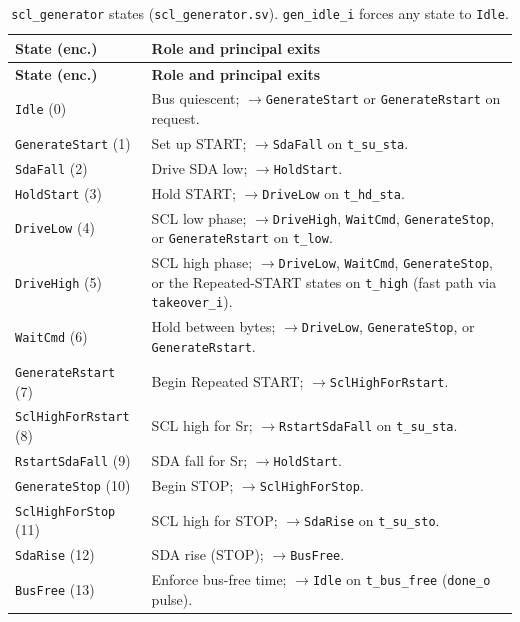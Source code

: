 \begin{longtable}{@{}l>{\raggedright\arraybackslash}p{}@{}}
\caption{\texttt{scl\_generator} states (\texttt{scl\_generator.sv}). \texttt{gen\_idle\_i} forces any state to \texttt{Idle}.}
\label{tab:app-scl-states}\\
\toprule
\textbf{State (enc.)} & \textbf{Role and principal exits} \\
\midrule
\endfirsthead
\toprule
\textbf{State (enc.)} & \textbf{Role and principal exits} \\
\midrule
\endhead
\bottomrule
\endfoot
\texttt{Idle} (0)             & Bus quiescent; $\to$\texttt{GenerateStart} or \texttt{GenerateRstart} on request. \\
\texttt{GenerateStart} (1)    & Set up START; $\to$\texttt{SdaFall} on \texttt{t\_su\_sta}. \\
\texttt{SdaFall} (2)          & Drive SDA low; $\to$\texttt{HoldStart}. \\
\texttt{HoldStart} (3)        & Hold START; $\to$\texttt{DriveLow} on \texttt{t\_hd\_sta}. \\
\texttt{DriveLow} (4)         & SCL low phase; $\to$\texttt{DriveHigh}, \texttt{WaitCmd}, \texttt{GenerateStop}, or \texttt{GenerateRstart} on \texttt{t\_low}. \\
\texttt{DriveHigh} (5)        & SCL high phase; $\to$\texttt{DriveLow}, \texttt{WaitCmd}, \texttt{GenerateStop}, or the Repeated-START states on \texttt{t\_high} (fast path via \texttt{takeover\_i}). \\
\texttt{WaitCmd} (6)          & Hold between bytes; $\to$\texttt{DriveLow}, \texttt{GenerateStop}, or \texttt{GenerateRstart}. \\
\texttt{GenerateRstart} (7)   & Begin Repeated START; $\to$\texttt{SclHighForRstart}. \\
\texttt{SclHighForRstart} (8) & SCL high for Sr; $\to$\texttt{RstartSdaFall} on \texttt{t\_su\_sta}. \\
\texttt{RstartSdaFall} (9)    & SDA fall for Sr; $\to$\texttt{HoldStart}. \\
\texttt{GenerateStop} (10)    & Begin STOP; $\to$\texttt{SclHighForStop}. \\
\texttt{SclHighForStop} (11)  & SCL high for STOP; $\to$\texttt{SdaRise} on \texttt{t\_su\_sto}. \\
\texttt{SdaRise} (12)         & SDA rise (STOP); $\to$\texttt{BusFree}. \\
\texttt{BusFree} (13)         & Enforce bus-free time; $\to$\texttt{Idle} on \texttt{t\_bus\_free} (\texttt{done\_o} pulse). \\
\end{longtable}

